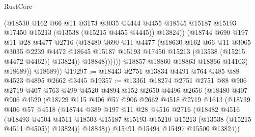 \begin{lexlean}{RustCore}
\begin{coremodule}
                          (@18530
                            @162
                            @66
                            @11
                            @3173
                            @3035
                            @4444
                            @4455
                            @18545
                            @15187
                            @15193
                            @17450
                            @15213
                            (@13538 (@15215 @4455 @4445))
                            @13824))
                        (@18744
                          @690
                          @197
                          @11
                          @28
                          @4477
                          @2716
                          (@18480
                            @690
                            @11
                            @4477
                            (@18630
                              @162
                              @66
                              @11
                              @3065
                              @3035
                              @2239
                              @4472
                              @18645
                              @15187
                              @15193
                              @17450
                              @15213
                              (@13538 (@15215 @4472 @4462))
                              @13824))
                          @18848))))))
              @18857
              @18860
              @18863
              @18866
              @14103)
            @18689))
        @18689))
@19297 := @18443 @2751 @13834 @4491 @764 @485 @88 @4523 @4895 @2662 @3445
@19357 := @13361
    @18274
    @2751
    @2751
    @88
    @906
    @2719
    @407
    @763
    @499
    @4520
    @4894
    @152
    @2650
    @4496
    @2656
    (@18480
      @407
      @906
      @4520
      (@18729
        @115
        @406
        @57
        @906
        @2662
        @4518
        @2719
        @1613
        (@18739
          @406
          @57
          @4518
          (@18744
            @389
            @197
            @11
            @28
            @4516
            @2716
            (@18482
              @4516
              (@18493
                @4504
                @4511
                @18503
                @15187
                @15193
                @15210
                @15213
                (@13538 (@15215 @4511 @4505))
                @13824))
            @18848))
        @15491
        @15494
        @15497
        @15500
        @13824))

\end{coremodule}
\end{lexlean}
